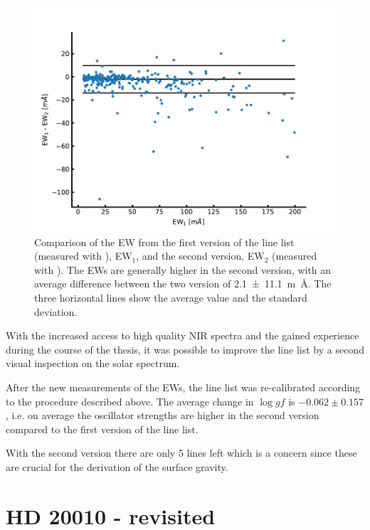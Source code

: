 \begin{figure}[htpb!]
    \centering
    \includegraphics[width=1.0\linewidth]{figures/linelist_comparison.pdf}
    \caption{Comparison of the EW from the first version of the line list (measured with
             ), EW$_1$, and the second version, EW$_2$ (measured with ).
             The EWs are generally higher in the second version, with an average difference between
             the two version of \SI{2.1+-11.1}{m\angstrom}. The three horizontal lines show the
             average value and the standard deviation.}
    \label{fig:linelist_comparison}
\end{figure}

With the increased access to high quality NIR spectra and the gained experience during the course
of the thesis, it was possible to improve the line list by a second visual inspection on the solar
spectrum.

After the new measurements of the EWs, the line list was re-calibrated according to the procedure
described above. The average change in $\log \mathit{gf}$ is $-0.062\pm0.157$, i.e. on average the
oscillator strengths are higher in the second version compared to the first version of the line
list.

With the second version there are only 5  lines left which is a concern since these are
crucial for the derivation of the surface gravity.




\section{HD 20010 - revisited}
\label{sec:HD20010_second}

